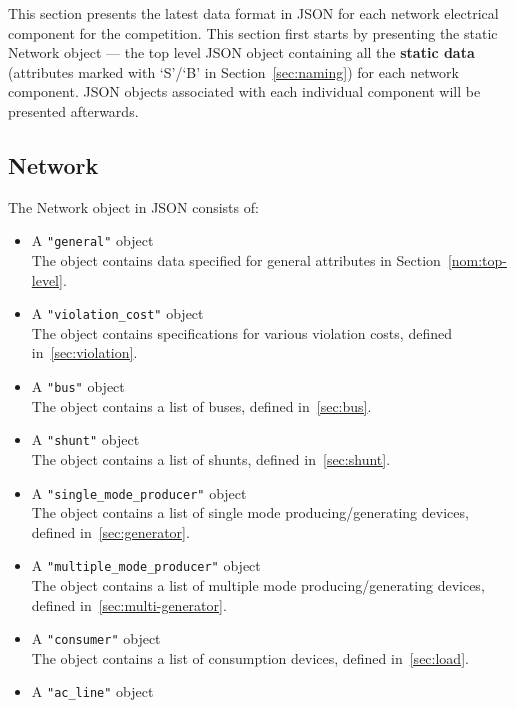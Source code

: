 This section presents the latest data format in JSON for 
each network electrical component for the competition.
This section first starts by presenting the static Network object ---
the top level JSON object containing all the \textbf{static data}
(attributes marked with `S'/`B' in Section~\ref{sec:naming}) for each network component.
JSON objects associated with each individual component will be presented afterwards.

\subsection{Network}
\label{sec:network}
The Network object in JSON consists of: 
\begin{itemize}
    \item A \texttt{"general"} object\\
    The object contains data specified for general attributes in Section~\ref{nom:top-level}.
    \item A \texttt{"violation\_cost"} object\\
    The object contains specifications for various violation costs, defined in~\ref{sec:violation}.
    \item A \texttt{"bus"} object\\
    The object contains a list of buses, defined in~\ref{sec:bus}.
    \item A \texttt{"shunt"} object\\
    The object contains a list of shunts, defined in~\ref{sec:shunt}.
    \item A \texttt{"single\_mode\_producer"} object\\
    The object contains a list of single mode producing/generating devices, defined in~\ref{sec:generator}.
    \item A \texttt{"multiple\_mode\_producer"} object\\
    The object contains a list of multiple mode producing/generating devices, defined in~\ref{sec:multi-generator}.
    \item A \texttt{"consumer"} object\\
    The object contains a list of consumption devices, defined in~\ref{sec:load}.
    \item A \texttt{"ac\_line"} object\\

\end{itemize}
